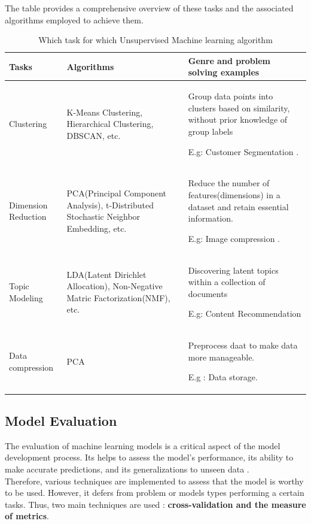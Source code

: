 \documentclass[12pt,a4paper, oneside]{book}
\begin{document}
The table provides a comprehensive overview of these tasks and the associated algorithms employed to achieve them.

\renewcommand{\arraystretch}{1.2}
\begin{table}[h]
	\begin{tabular}{p{3cm}p{5.6cm}p{6cm}} 
		
		\toprule 
		Tasks & Algorithms & Genre and problem solving examples    \\
		\toprule
		Clustering & K-Means Clustering, Hierarchical Clustering, DBSCAN, etc. & Group data points into clusters based on similarity, without prior knowledge of group labels
		
		E.g: Customer Segmentation . \\
		
		Dimension Reduction & PCA(Principal Component Analysis), t-Distributed Stochastic Neighbor Embedding, etc. & Reduce the number of features(dimensions) in a dataset and retain essential information.
		
		E.g: Image compression .\\
		Topic Modeling & LDA(Latent Dirichlet Allocation), Non-Negative Matric Factorization(NMF), etc. & Discovering latent topics within a collection of documents
		
		E.g: Content Recommendation \\
		
		Data compression & PCA & Preprocess daat to make data more manageable.
		
		E.g : Data storage.\\
						
		\bottomrule
	\end{tabular} 
	\caption{Which task for which Unsupervised Machine learning algorithm} 
	\label{whichTaskWhichModelUnsupervised} 
\end{table}  


\subsection{Model Evaluation}
The evaluation of machine learning models is a critical aspect of the model development process. Its helps to assess the model's performance, its ability to make accurate predictions, and its generalizations to unseen data \citep{raschka2018model}. \\

Therefore, various techniques are implemented to assess that the model is worthy to be used. However, it defers from problem or models types performing a certain tasks. Thus, two main techniques are used : \textbf{cross-validation and the measure of metrics}.\\
\end{document}
